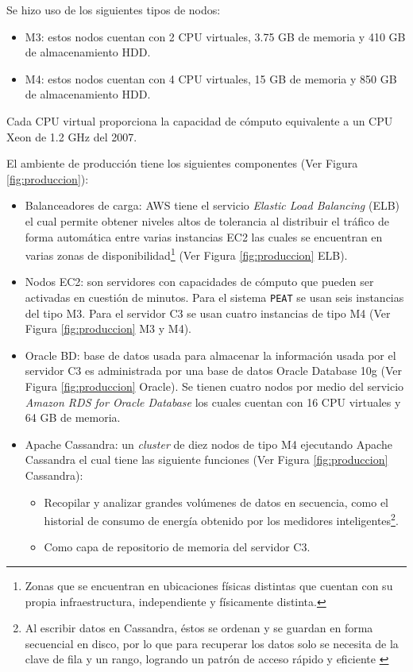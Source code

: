 
Se hizo uso de los siguientes tipos de nodos:
\begin{itemize}
\item M3: estos nodos cuentan con 2 CPU virtuales, 3.75 GB de memoria y
  410 GB de almacenamiento HDD.
\item M4: estos nodos cuentan con 4 CPU virtuales, 15 GB de memoria y
  850 GB de almacenamiento HDD.
\end{itemize}

Cada CPU virtual proporciona la capacidad de cómputo equivalente a un CPU
Xeon de 1.2 GHz del 2007.

\vspace{2.5mm}

El ambiente de producción tiene los siguientes componentes (Ver Figura \ref{fig:produccion}):
\begin{itemize}
\item Balanceadores de carga: AWS tiene el servicio \textit{Elastic Load Balancing}
  (ELB) el cual permite obtener niveles altos de tolerancia al distribuir el tráfico
  de forma automática entre varias instancias EC2 las cuales se encuentran en
  varias zonas de disponibilidad\footnote{Zonas que se encuentran en
    ubicaciones físicas distintas que cuentan con su propia infraestructura,
    independiente y físicamente distinta.} (Ver Figura \ref{fig:produccion} ELB).
\item Nodos EC2: son servidores con capacidades de cómputo que pueden ser
  activadas en cuestión de minutos. Para el sistema \texttt{PEAT} se usan seis
  instancias del tipo M3. Para el servidor C3 se usan cuatro instancias de
  tipo M4 (Ver Figura \ref{fig:produccion} M3 y M4).
\item Oracle BD: base de datos usada para almacenar la información usada
  por el servidor C3 es administrada por una base de datos Oracle Database 10g
  (Ver Figura \ref{fig:produccion} Oracle). Se tienen cuatro nodos por medio del
  servicio \textit{Amazon RDS for Oracle Database} los cuales cuentan con
  16 CPU virtuales y 64 GB de memoria.
\item Apache Cassandra: un \textit{cluster} de diez nodos de tipo M4 ejecutando
  Apache Cassandra el cual tiene las siguiente funciones (Ver Figura
  \ref{fig:produccion} Cassandra):
  \begin{itemize}
  \item Recopilar y analizar grandes volúmenes de datos en secuencia, como el
    historial de consumo de energía obtenido por los medidores inteligentes\footnote{
      Al escribir datos en Cassandra, éstos se ordenan y se guardan en forma secuencial
      en disco, por lo que para recuperar los datos solo se necesita
      de la clave de fila y un rango, logrando un patrón de acceso rápido y eficiente
      \cite{33_time_series}}.
  \item Como capa de repositorio de memoria del servidor C3.
  \end{itemize}
\end{itemize}

